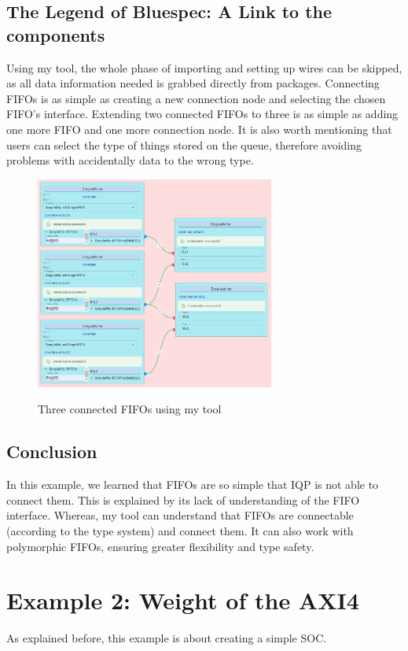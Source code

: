 \documentclass[12pt]{report}
\begin{document}
\subsection{The Legend of Bluespec: A Link to the components} 
Using my tool, the whole phase of importing and setting up wires can be skipped, as all data information needed is grabbed directly from packages. 
Connecting FIFOs is as simple as creating a new connection node and selecting the chosen FIFO's interface.
Extending two connected FIFOs to three is as simple as adding one more FIFO and one more connection node. 
It is also worth mentioning that users can select the type of things stored on the queue, therefore avoiding problems with accidentally  data to the wrong type. 
\begin{figure}[H] 
    \caption{Three connected FIFOs using my tool} 
    \includegraphics[width=0.7\textwidth]{images/Example1MySolution.png} \\ \centering 
\end{figure} 
\subsection{Conclusion} 
In this example, we learned that FIFOs are so simple that IQP is not able to connect them. This is explained by its lack of understanding of the FIFO interface. 
Whereas, my tool can understand that FIFOs are connectable (according to the type system) and connect them. It can also work with polymorphic FIFOs, ensuring greater flexibility and type safety. 
 
\section{Example 2: Weight of the AXI4} 
As explained before, this example is about creating a simple SOC. 
\end{document}
